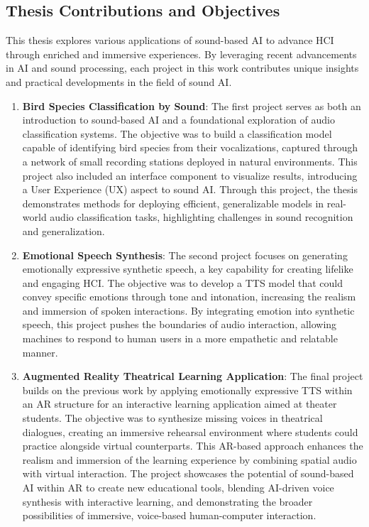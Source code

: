 \subsection{Thesis Contributions and Objectives}
This thesis explores various applications of sound-based AI to advance HCI through enriched and immersive experiences. By leveraging recent advancements in AI and sound processing, each project in this work contributes unique insights and practical developments in the field of sound AI.

\begin{enumerate}
\item \textbf{Bird Species Classification by Sound}: The first project serves as both an introduction to sound-based AI and a foundational exploration of audio classification systems. The objective was to build a classification model capable of identifying bird species from their vocalizations, captured through a network of small recording stations deployed in natural environments. This project also included an interface component to visualize results, introducing a User Experience (UX) aspect to sound AI. Through this project, the thesis demonstrates methods for deploying efficient, generalizable models in real-world audio classification tasks, highlighting challenges in sound recognition and generalization.

\item \textbf{Emotional Speech Synthesis}: The second project focuses on generating emotionally expressive synthetic speech, a key capability for creating lifelike and engaging HCI. The objective was to develop a TTS model that could convey specific emotions through tone and intonation, increasing the realism and immersion of spoken interactions. By integrating emotion into synthetic speech, this project pushes the boundaries of audio interaction, allowing machines to respond to human users in a more empathetic and relatable manner.

\item \textbf{Augmented Reality Theatrical Learning Application}: The final project builds on the previous work by applying emotionally expressive TTS within an AR structure for an interactive learning application aimed at theater students. The objective was to synthesize missing voices in theatrical dialogues, creating an immersive rehearsal environment where students could practice alongside virtual counterparts. This AR-based approach enhances the realism and immersion of the learning experience by combining spatial audio with virtual interaction. The project showcases the potential of sound-based AI within AR to create new educational tools, blending AI-driven voice synthesis with interactive learning, and demonstrating the broader possibilities of immersive, voice-based human-computer interaction.
\end{enumerate}
